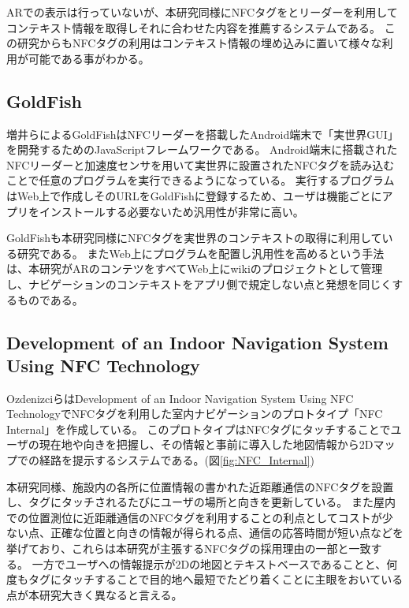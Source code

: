 ARでの表示は行っていないが、本研究同様にNFCタグをとリーダーを利用してコンテキスト情報を取得しそれに合わせた内容を推薦するシステムである。
この研究からもNFCタグの利用はコンテキスト情報の埋め込みに置いて様々な利用が可能である事がわかる。


\subsection{GoldFish}
増井らによるGoldFish\cite{10.1145/2407696.2407699}はNFCリーダーを搭載したAndroid端末で「実世界GUI」を開発するためのJavaScriptフレームワークである。
Android端末に搭載されたNFCリーダーと加速度センサを用いて実世界に設置されたNFCタグを読み込むことで任意のプログラムを実行できるようになっている。
実行するプログラムはWeb上で作成しそのURLをGoldFishに登録するため、ユーザは機能ごとにアプリをインストールする必要ないため汎用性が非常に高い。

GoldFishも本研究同様にNFCタグを実世界のコンテキストの取得に利用している研究である。
またWeb上にプログラムを配置し汎用性を高めるという手法は、本研究がARのコンテツをすべてWeb上にwikiのプロジェクトとして管理し、ナビゲーションのコンテキストをアプリ側で規定しない点と発想を同じくするものである。

\subsection{Development of an Indoor Navigation System Using NFC Technology}
OzdenizciらはDevelopment of an Indoor Navigation System Using NFC Technology\cite{5954491}でNFCタグを利用した室内ナビゲーションのプロトタイプ「NFC Internal」を作成している。
このプロトタイプはNFCタグにタッチすることでユーザの現在地や向きを把握し、その情報と事前に導入した地図情報から2Dマップでの経路を提示するシステムである。(図\ref{fig:NFC_Internal})

本研究同様、施設内の各所に位置情報の書かれた近距離通信のNFCタグを設置し、タグにタッチされるたびにユーザの場所と向きを更新している。
また屋内での位置測位に近距離通信のNFCタグを利用することの利点としてコストが少ない点、正確な位置と向きの情報が得られる点、通信の応答時間が短い点などを挙げており、これらは本研究が主張するNFCタグの採用理由の一部と一致する。
一方でユーザへの情報提示が2Dの地図とテキストベースであることと、何度もタグにタッチすることで目的地へ最短でたどり着くことに主眼をおいている点が本研究大きく異なると言える。

